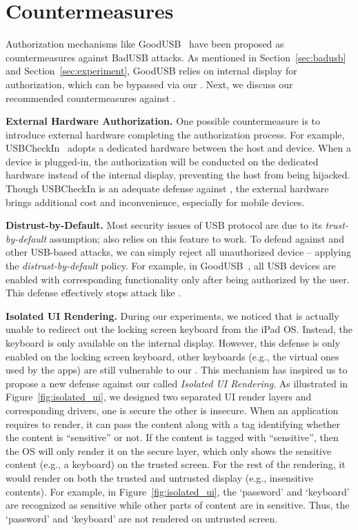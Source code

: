 \section{Countermeasures}
\label{sec:countermeasures}

Authorization mechanisms like GoodUSB~\cite{tian2015defending} have been
proposed as countermeasures against BadUSB attacks. As mentioned in
Section~\ref{sec:badusb} and Section~\ref{sec:experiment}, GoodUSB relies on
internal display for authorization, which can be bypassed via our \tool. 
Next, we discuss our recommended countermeasures against \tool.

\textbf{External Hardware Authorization.} One possible countermeasure is to
introduce external hardware completing the authorization process. For example,
 USBCheckIn~\cite{usbcheckin} adopts a dedicated hardware between
the host and device. When a device is plugged-in, the authorization will be
conducted on the dedicated hardware instead of the internal display, preventing
the host from being hijacked. Though USBCheckIn is an adequate defense against
\tool, the external hardware brings additional cost and inconvenience,
especially for mobile devices.

\textbf{Distrust-by-Default.} Most security issues of \ac{USB} protocol are due to
its \textit{trust-by-default} assumption; \tool also relies on this feature to work.
To defend against \tool and other USB-based attacks, we can simply reject all
{unauthorized} device -- applying the \textit{distrust-by-default} policy. For example, 
in GoodUSB~\cite{tian2015defending}, all \ac{USB} devices are enabled with corresponding 
functionality only after being authorized by the user. This defense effectively stops attack 
like \tool.

\textbf{Isolated \ac{UI} Rendering.} During our experiments, we noticed that \tool
is actually unable to redirect out the locking screen keyboard from the iPad
OS. Instead, the keyboard is only available on the internal display. However,
this defense is only enabled on the locking screen keyboard, other keyboards
(e.g., the virtual ones used by the apps) are still vulnerable to our \tool.
This mechanism has inspired us to propose a new defense against our \tool
called \emph{Isolated \ac{UI} Rendering}. As illustrated in
Figure~\ref{fig:isolated_ui}, we designed two separated \ac{UI} render layers and corresponding drivers, one
is secure the other is insecure. When an application requires to render, it can
pass the content along with a tag identifying whether the content is
``sensitive'' or not. If the content is tagged with ``sensitive'', then the OS
will only render it on the secure layer, which only shows the sensitive content
(e.g., a keyboard) on the trusted screen. For the rest of the rendering, it
would render on both the trusted and untrusted display (e.g., insensitive
contents).
For example, in Figure~\ref{fig:isolated_ui}, the `password' and `keyboard' are recognized as sensitive while other parts of content are in sensitive. Thus, the `password' and `keyboard' are not rendered on untrusted screen.


